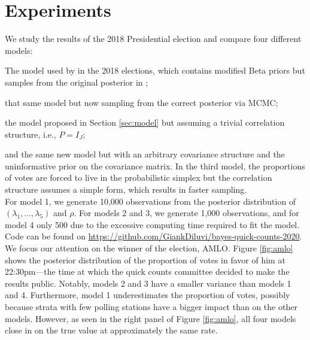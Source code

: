 \documentclass{article}
\begin{document}



\section{Experiments} \label{sec:experiments}


We study the results of the 2018 Presidential election and compare four different models:
\benum
  \item The model used by \citet{diluvi2018} in the 2018 elections, which contains modified Beta priors but samples from the original posterior in \citet{mendoza-nieto2016};
  \item that same model but now sampling from the correct posterior via MCMC;
  \item the model proposed in Section \ref{sec:model} but assuming a trivial correlation structure, i.e., $P = I_J$;
  \item and the same new model but with an arbitrary covariance structure and the uninformative prior on the covariance matrix.
\eenum
In the third model, the proportions of votes are forced to live in the probabilistic simplex but the correlation structure assumes a simple form, which results in faster sampling. \\

For model 1, we generate 10,000 observations from the posterior distribution of $(\lambda_1, ..., \lambda_5)$ and $\rho$. For models 2 and 3, we generate 1,000 observations, and for model 4 only 500 due to the excessive computing time required to fit the model. Code can be found on \href{https://github.com/GiankDiluvi/bayes-quick-counts-2020}{\url{https://github.com/GiankDiluvi/bayes-quick-counts-2020}}. \\


We focus our attention on the winner of the election, AMLO. Figure \ref{fig:amlo} shows the posterior distribution of the proportion of votes in favor of him at 22:30pm---the time at which the quick counts committee decided to make the results public. Notably, models 2 and 3 have a smaller variance than models 1 and 4. Furthermore, model 1 underestimates the proportion of votes, possibly because strata with few polling stations have a bigger impact than on the other models. However, as seen in the right panel of Figure \ref{fig:amlo}, all four models close in on the true value at approximately the same rate. \\
\end{document}
